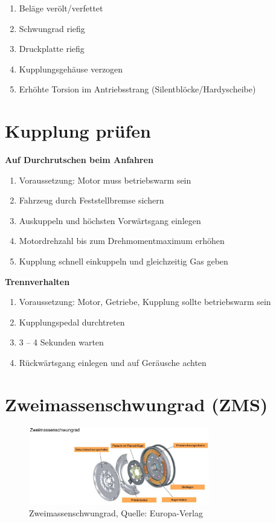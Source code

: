 \begin{enumerate}
\item
  Beläge verölt/verfettet
\item
  Schwungrad riefig
\item
  Druckplatte riefig
\item
  Kupplungsgehäuse verzogen
\item
  Erhöhte Torsion im Antriebsstrang (Silentblöcke/Hardyscheibe)
\end{enumerate}

\section{Kupplung prüfen}\label{kupplung-pruefen}

\textbf{Auf Durchrutschen beim Anfahren}

\begin{enumerate}
\item
  Voraussetzung: Motor muss betriebswarm sein
\item
  Fahrzeug durch Feststellbremse sichern
\item
  Auskuppeln und höchsten Vorwärtsgang einlegen
\item
  Motordrehzahl bis zum Drehmomentmaximum erhöhen
\item
  Kupplung schnell einkuppeln und gleichzeitig Gas geben
\end{enumerate}

\textbf{Trennverhalten}

\begin{enumerate}
\item
  Voraussetzung: Motor, Getriebe, Kupplung sollte betriebswarm sein
\item
  Kupplungspedal durchtreten
\item
  3 -- 4 Sekunden warten
\item
  Rückwärtsgang einlegen und auf Geräusche achten
\end{enumerate}

\newpage

\section{Zweimassenschwungrad (ZMS)}\label{zweimassenschwungrad-zms}

\begin{figure}[!ht]%
\centering
\includegraphics[width=0.7\textwidth]{images/Kupplung/Kupplung-9.pdf}
\caption{Zweimassenschwungrad, Quelle: Europa-Verlag}
\end{figure}

